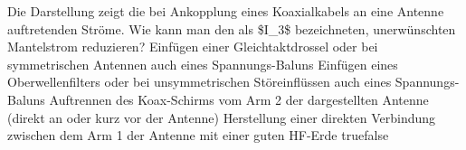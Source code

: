    {Die Darstellung zeigt die bei Ankopplung eines Koaxialkabels an eine Antenne auftretenden Ströme. Wie kann man den als \$I\_3\$ bezeichneten, unerwünschten Mantelstrom reduzieren?}
    {Einfügen einer Gleichtaktdrossel oder bei symmetrischen Antennen auch eines Spannungs-Baluns}
    {Einfügen eines Oberwellenfilters oder bei unsymmetrischen Störeinflüssen auch eines Spannungs-Baluns}
    {Auftrennen des Koax-Schirms vom Arm 2 der dargestellten Antenne (direkt an oder kurz vor der Antenne)}
    {Herstellung einer direkten Verbindung zwischen dem Arm 1 der Antenne mit einer guten HF-Erde}
    {true}{false}